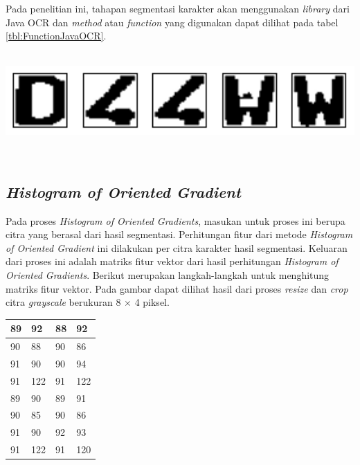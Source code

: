 \noindent Pada penelitian ini, tahapan segmentasi karakter akan menggunakan \textit{library} dari Java OCR dan \textit{method} atau \textit{function} yang digunakan dapat dilihat pada tabel \ref{tbl:FunctionJavaOCR}.\\
\\
\begin{adjustbox}{width=1\textwidth}
	\noindent\begin{minipage}{\linewidth}
		\centering\includegraphics[width=14cm]{images/OutputSegmentasi.png}
		\label{fig:OutputSegmentasi}
	\end{minipage}
\end{adjustbox}\\

\subsection{\textit{Histogram of Oriented Gradient}}
\noindent Pada proses \textit{Histogram of Oriented Gradients}, masukan untuk proses ini berupa citra yang berasal dari hasil segmentasi. Perhitungan fitur dari metode \textit{Histogram of Oriented Gradient} ini dilakukan per citra karakter hasil segmentasi. Keluaran dari proses ini adalah matriks fitur vektor dari hasil perhitungan \textit{Histogram of Oriented Gradients}. Berikut merupakan langkah-langkah untuk menghitung matriks fitur vektor. Pada gambar dapat dilihat hasil dari proses \textit{resize} dan \textit{crop} citra \textit{grayscale} berukuran 8 $\times$ 4 piksel.

\begin{table}[H]
	\centering
	\begin{small}
		\begin{tabular}{|p{2cm}|p{2cm}|p{2cm}|p{2cm}|}
			\hline
			89 & 92 & 88 & 92 \\
			\hline
			90 & 88 & 90 & 86 \\
			\hline
			91 & 90 & 90 & 94 \\
			\hline
			91 & 122 & 91 & 122 \\
			\hline
			89 & 90 & 89 & 91 \\
			\hline
			90 & 85 & 90 & 86 \\
			\hline
			91 & 90 & 92 & 93 \\
			\hline
			91 & 122 & 91 & 120 \\
			\hline
		\end{tabular}
	\end{small}
	\label{fig:MatriksCitraHasilPreprocessing}
\end{table}

